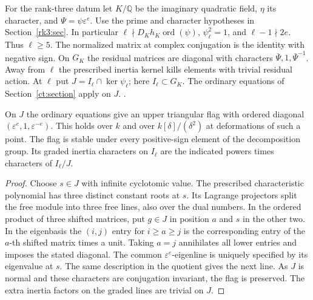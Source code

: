 For the rank-three datum let \(K/\mathbb Q\) be the imaginary quadratic
field, \(\eta\) its character, and \(\Psi=\psi\varepsilon^e\).
Use the prime and character hypotheses in Section~\ref{rk3:sec}.
In particular \(\ell\nmid D_K h_K\operatorname{ord}(\psi)\),
\(\psi_\ell^2=1\), and \(\ell-1\nmid2e\). Thus \(\ell\ge5\).
The normalized matrix at complex conjugation is the identity with
negative sign. On \(G_K\) the residual matrices are diagonal with
characters \(\bar\Psi,1,\bar\Psi^{-1}\). Away from \(\ell\) the
prescribed inertia kernel kills elements with trivial residual action.
At \(\ell\) put \(J=I_\ell\cap\ker\psi_\ell\); here \(I_\ell\subset G_K\).
The ordinary equations of Section~\ref{ct:section} apply on \(J\).
.

\begin{lemma}\label{spreal:flag}
On \(J\) the ordinary equations give an upper triangular flag with
ordered diagonal \((\varepsilon^e,1,\varepsilon^{-e})\). This holds
over \(k\) and over \(k[\delta]/(\delta^2)\) at deformations of such
a point. The flag is stable under every positive-sign element of the
decomposition group. Its graded inertia characters on \(I_\ell\)
are the indicated powers times characters of \(I_\ell/J\).
\end{lemma}
\begin{proof}
Choose \(s\in J\) with infinite cyclotomic value. The prescribed
characteristic polynomial has three distinct constant roots at \(s\).
Its Lagrange projectors split the free module into three free lines,
also over the dual numbers. In the ordered product of three shifted
matrices, put \(g\in J\) in position \(a\) and \(s\) in the other
two. In the eigenbasis the \((i,j)\) entry for \(i\ge a\ge j\)
is the corresponding entry of the \(a\)-th shifted matrix times
a unit. Taking \(a=j\) annihilates all lower entries and imposes
the stated diagonal. The common \(\varepsilon^e\)-eigenline is
uniquely specified by its eigenvalue at \(s\). The same description
in the quotient gives the next line. As \(J\) is normal and these
characters are conjugation invariant, the flag is preserved.
The extra inertia factors on the graded lines are trivial on \(J\).
\end{proof}

